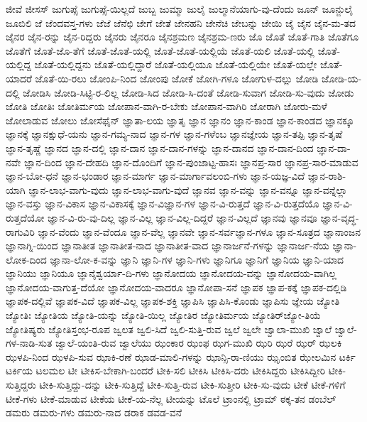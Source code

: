 ಜೀವೆ
ಜೀಸಸ್
ಜುಗುಪ್ಸೆ
ಜುಗುಪ್ಸೆ-ಯಿಲ್ಲದೆ
ಜುಬ್ಬ
ಜುಮ್ಮಾ
ಜುಲೈ
ಜುಲ್ಮಾನೆಯಾಗು-ವು-ದೆಂದು
ಜೂನ್
ಜೂನ್ಜುಲೈ
ಜೂಬಿಲಿ
ಜೆ
ಜೆಂದವಸ್ತ-ಗಳು
ಜೆಜೆ
ಜೆನೆಛಿ
ಜೇಗೆ
ಜೇತೆ
ಜೇನಹನಿ
ಜೇನೆಚಿ
ಜೇಬನ್ನು
ಜೇಯಿ
ಜೈ
ಜೈನ
ಜೈನ-ಮ-ತದ
ಜೈನರ
ಜೈನ-ರನ್ನು
ಜೈನ-ರಿದ್ದರು
ಜೈನರು
ಜೈನರೂ
ಜೈನಶ್ರಮಣ
ಜೈನಶ್ರಮ-ಣರು
ಜೊ
ಜೊತೆ
ಜೊತೆ-ಗಾತಿ
ಜೊತೆಗೂ
ಜೊತೆಗೆ
ಜೊತೆ-ಜೊ-ತೆಗೆ
ಜೊತೆ-ಜೊತೆ-ಯಲ್ಲಿ
ಜೊತೆ-ಜೊತೆ-ಯಲ್ಲಿಯೆ
ಜೊತೆ-ಯಲಿ
ಜೊತೆ-ಯಲ್ಲಿ
ಜೊತೆ-ಯಲ್ಲಿದ್ದ
ಜೊತೆ-ಯಲ್ಲಿದ್ದನು
ಜೊತೆ-ಯಲ್ಲಿದ್ದಾರೆ
ಜೊತೆ-ಯಲ್ಲಿಯೂ
ಜೊತೆ-ಯಲ್ಲಿಯೇ
ಜೊತೆ-ಯಲ್ಲೇ
ಜೊತೆ-ಯಾದರೆ
ಜೊತೆ-ಯಿ-ರಲು
ಜೋಂಪಿ-ನಿಂದ
ಜೋಂಪು
ಜೋಕೆ
ಜೋಗಿ-ಗಳೂ
ಜೋಗುಳ-ದಲ್ಲು
ಜೋಡಿ
ಜೋಡಿ-ಯ-ದಲ್ಲಿ
ಜೋಡಿಸಿ
ಜೋಡಿ-ಸಿಟ್ಟಿ-ರ-ಲಿಲ್ಲ
ಜೋಡಿ-ಸಿದ
ಜೋಡಿ-ಸಿ-ದಂತೆ
ಜೋಡಿ-ಸುವಾಗ
ಜೋಡಿ-ಸು-ವುದು
ಜೋಡು
ಜೋತಿ
ಜೋತಿಃ
ಜೋತಿರ್ಮಯ
ಜೋಪಾನ-ವಾಗಿ-ರ-ಬೇಕು
ಜೋಪಾನ-ವಾಗಿರಿ
ಜೋರಾಗಿ
ಜೋರು-ಮಳೆ
ಜೋಲಾಡುವ
ಜೋಲು
ಜೋಸೆಫೈನ್
ಜ್ಞಾತಾ-ಲಯ
ಜ್ಞಾತೃ
ಜ್ಞಾನ
ಜ್ಞಾನಂ
ಜ್ಞಾನ-ಕಾಂಡ
ಜ್ಞಾನ-ಕಾಂಡದ
ಜ್ಞಾನಕ್ಕೂ
ಜ್ಞಾನಕ್ಕೆ
ಜ್ಞಾನಕ್ಷುಧೆ-ಯನು
ಜ್ಞಾನ-ಗಮ್ಯ-ನಾದ
ಜ್ಞಾನ-ಗಳ
ಜ್ಞಾನ-ಗಳೆಂಬ
ಜ್ಞಾನಜ್ಞೇಯ
ಜ್ಞಾನ-ತಪ್ಪಿ
ಜ್ಞಾನ-ತೃಷೆ
ಜ್ಞಾನ-ತೃಷ್ಣೆ
ಜ್ಞಾನದ
ಜ್ಞಾನ-ದಲ್ಲಿ
ಜ್ಞಾನ-ದಾನ
ಜ್ಞಾನ-ದಾನ-ಗಳನ್ನು
ಜ್ಞಾನ-ದಾನದ
ಜ್ಞಾನ-ದಾನ-ದಿಂದ
ಜ್ಞಾನ-ದಾ-ನವೇ
ಜ್ಞಾನ-ದಿಂದ
ಜ್ಞಾನ-ದೇಹದಿ
ಜ್ಞಾನ-ದೊಂದಿಗೆ
ಜ್ಞಾನ-ಪುಂಜಾಟ್ಟ-ಹಾಸಃ
ಜ್ಞಾನಪ್ರ-ಸಾರ
ಜ್ಞಾನಪ್ರ-ಸಾರ-ಮಾಡುವ
ಜ್ಞಾನ-ಬೋ-ಧನೆ
ಜ್ಞಾನ-ಭಂಡಾರ
ಜ್ಞಾನ-ಮಾರ್ಗ
ಜ್ಞಾನ-ಮಾರ್ಗಾವಲಂಬಿ-ಗಳು
ಜ್ಞಾನ-ಯಜ್ಞ-ವಿದೆ
ಜ್ಞಾನ-ರಾಶಿ-ಯಾಗಿ
ಜ್ಞಾನ-ಲಾಭ-ವಾಗು-ವುದು
ಜ್ಞಾನ-ಲಾಭ-ವಾಗು-ವುದೆ
ಜ್ಞಾನವ
ಜ್ಞಾನ-ವನ್ನು
ಜ್ಞಾನ-ವನ್ನೂ
ಜ್ಞಾನ-ವನ್ನೆಲ್ಲಾ
ಜ್ಞಾನ-ವಸ್ತು
ಜ್ಞಾನ-ವಿಕಾಸ
ಜ್ಞಾನ-ವಿಕಾಸಕ್ಕೆ
ಜ್ಞಾನ-ವಿಜ್ಞಾನ-ಗಳ
ಜ್ಞಾನ-ವಿ-ರುತ್ತದೆ
ಜ್ಞಾನ-ವಿ-ರುತ್ತದೆಯೊ
ಜ್ಞಾನ-ವಿ-ರುತ್ತದೆಯೋ
ಜ್ಞಾನ-ವಿ-ರು-ವು-ದಿಲ್ಲ
ಜ್ಞಾನ-ವಿಲ್ಲ
ಜ್ಞಾನ-ವಿಲ್ಲ-ದಿದ್ದರೆ
ಜ್ಞಾನ-ವಿಲ್ಲದೆ
ಜ್ಞಾನವು
ಜ್ಞಾನವೂ
ಜ್ಞಾನ-ವೃದ್ಧ-ರಾಗುವಿರಿ
ಜ್ಞಾನ-ವೆಂದು
ಜ್ಞಾನ-ವೆಂದೂ
ಜ್ಞಾನ-ವೆಲ್ಲ
ಜ್ಞಾನವೇ
ಜ್ಞಾನ-ಸರ್ವಜ್ಞಾನ-ಗಳೂ
ಜ್ಞಾನ-ಸೂತ್ರದ
ಜ್ಞಾನಾಂಜನ
ಜ್ಞಾನಾಗ್ನಿ-ಯಿಂದ
ಜ್ಞಾನಾತೀತ
ಜ್ಞಾನಾತೀತ-ನಾದ
ಜ್ಞಾನಾತೀತ-ವಾದ
ಜ್ಞಾನಾರ್ಜನೆ-ಗಳನ್ನು
ಜ್ಞಾನಾರ್ಜ-ನೆಯ
ಜ್ಞಾನಾ-ಲೋಕ-ದಿಂದ
ಜ್ಞಾನಾ-ಲೋ-ಕ-ವನ್ನು
ಜ್ಞಾನಿ
ಜ್ಞಾನಿ-ಗಳ
ಜ್ಞಾನಿ-ಗಳು
ಜ್ಞಾನಿಗೂ
ಜ್ಞಾನಿಗೆ
ಜ್ಞಾನಿಯ
ಜ್ಞಾನಿ-ಯಾದ
ಜ್ಞಾನಿಯು
ಜ್ಞಾನಿಯೂ
ಜ್ಞಾನೈಶ್ವರ್ಯಾ-ದಿ-ಗಳು
ಜ್ಞಾನೋದಯ
ಜ್ಞಾನೋದಯ-ವನ್ನು
ಜ್ಞಾನೋದಯ-ವಾಗಿಲ್ಲ
ಜ್ಞಾನೋದಯ-ವಾಗುತ್ತ-ದೆಯೋ
ಜ್ಞಾನೋದಯ-ವಾದರೂ
ಜ್ಞಾನೋಪಾ-ಸನೆ
ಜ್ಞಾಪಕ
ಜ್ಞಾಪ-ಕಕ್ಕೆ
ಜ್ಞಾಪಕ-ದಲ್ಲಿಡಿ
ಜ್ಞಾಪಕ-ದಲ್ಲಿವೆ
ಜ್ಞಾಪಕ-ವಿದೆ
ಜ್ಞಾಪಕ-ವಿಲ್ಲ
ಜ್ಞಾಪಕ-ಶಕ್ತಿ
ಜ್ಞಾಪಿಸಿ
ಜ್ಞಾಪಿಸಿ-ಕೊಂಡು
ಜ್ಞಾಪಿಸು
ಜ್ಞೇಯ
ಜ್ಯೋತಿ
ಜ್ಯೋತಿಃ
ಜ್ಯೋತಿಯ
ಜ್ಯೋತಿ-ಯನ್ನು
ಜ್ಯೋತಿ-ಯಿಲ್ಲ
ಜ್ಯೋತಿರ
ಜ್ಯೋತಿರ್ಮಯ
ಜ್ಯೋತಿರ್‌ಜ್ಯೋ-ತಿಯೆ
ಜ್ಯೋತಿಷ್ಯರು
ಜ್ಯೋತಿಸ್ತಂಭ-ರೂಪ
ಜ್ವಲತ
ಜ್ವಲಿ-ಸಿದೆ
ಜ್ವಲಿ-ಸುತ್ತಿ-ರುವ
ಜ್ವಲೆ
ಜ್ವಲೇ
ಜ್ವಾಲಾ-ಮುಖಿ
ಜ್ವಾಲೆ
ಜ್ವಾಲೆ-ಗಳ-ನಾಡಿ-ಸುತ
ಜ್ವಾಲೆ-ಯಂತಿ-ರುವ
ಜ್ವಾಲೆಯು
ಝಂಕಾರ
ಝಂಫ
ಝಗ-ಮುಖಿ
ಝರಿ
ಝರೆ
ಝರ್
ಝಲಕಿ
ಝಳಪಿ-ನಿಂದ
ಝಳಪಿ-ಸುವ
ಝಾಕಿ-ರಣೆ
ಝಾಡ-ಮಾಲಿ-ಗಳನ್ನು
ಝಾನ್ಸಿ-ರಾ-ಣಿಯು
ಝೃಂಬಿತ
ಝೇಲಮಿನ
ಟರ್ಕಿ
ಟರ್ಕಿಯ
ಟಲಮಲ
ಟೀ
ಟೀಕಿಸ-ಬೇಕಾಗಿ-ಬಂದರೆ
ಟೀಕಿ-ಸಲಿ
ಟೀಕಿಸಿ
ಟೀಕಿಸಿ-ದರು
ಟೀಕಿಸಿದ್ದರು
ಟೀಕಿಸಿದ್ದೀರಿ
ಟೀಕಿ-ಸುತ್ತಿದ್ದರು
ಟೀಕಿ-ಸುತ್ತಿದ್ದು-ದನ್ನು
ಟೀಕಿ-ಸುತ್ತಿದ್ದೆ
ಟೀಕಿ-ಸುತ್ತಿ-ರುವ
ಟೀಕಿ-ಸುತ್ತೀರಿ
ಟೀಕಿ-ಸು-ವುದು
ಟೀಕೆ
ಟೀಕೆ-ಗಳಿಗೆ
ಟೀಕೆ-ಗಳು
ಟೀಕೆ-ಮಾಡುವ
ಟೀಕೆಯ
ಟೀಕೆ-ಯ-ನೆಲ್ಲ
ಟೀಯನ್ನು
ಟೊಲೆ
ಟ್ರಾಂನಲ್ಲಿ
ಟ್ರಾಮ್
ಠಕ್ಕ-ತನ
ಡಂಬೆಲ್
ಡಮರು
ಡಮರು-ಗಳು
ಡಮರು-ನಾದ
ಡರಾಕ
ಡವಡ-ವನೆ
